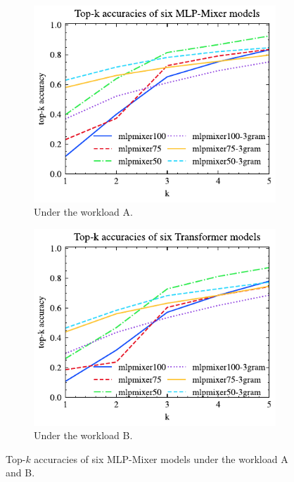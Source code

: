 \documentclass[conference]{IEEEtran}
\begin{document}
\begin{figure}[!th]
	\centering
	\begin{subfigure}{0.45\textwidth}
		\centering
		\includegraphics[]{graphics/top_k_mlpmixer_A.pdf}
		\caption{Under the workload A.}
		\label{fig:top_k_mlpmixer_A}
	\end{subfigure}
	\hfill
	\begin{subfigure}{0.45\textwidth}
		\centering
		\includegraphics[]{graphics/top_k_mlpmixer_B.pdf}
		\caption{Under the workload B.}
		\label{fig:top_k_mlpmixer_B}
	\end{subfigure}
	\caption{Top-$k$ accuracies of six MLP-Mixer models under the workload A and B.}
	\label{fig:top_k_mlpmixer_all}
\end{figure}
\end{document}
